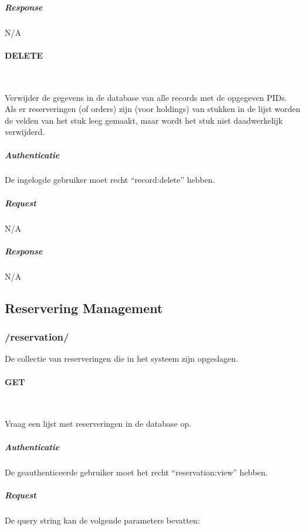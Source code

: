 \documentclass[a4paper,titlepage]{report}
\makeatletter
\def\namedlabel#1#2{
  \label{#1}
  \begingroup
   \def\@currentlabel{#2}%
   \label{#1:name}\endgroup
}
\makeatother
\begin{document}
          \subparagraph{Response} N/A

        \paragraph{DELETE}\hfill\\
          \namedlabel{api:record:delete}{DELETE /record/[pid,pid,pid,\ldots]}
          Verwijder de gegevens in de database van alle records met de
          opgegeven PIDs.  Als er reserveringen (of orders) zijn (voor holdings)
          van stukken in de lijst worden de velden van het stuk leeg gemaakt, maar
          wordt het stuk niet daadwerkelijk verwijderd. 

          \subparagraph{Authenticatie}
            De ingelogde gebruiker moet recht ``record:delete'' hebben.

          \subparagraph{Request} N/A
          \subparagraph{Response} N/A

    \pagebreak
    \subsection{Reservering Management}
      \subsubsection{/reservation/}
        De collectie van reserveringen die in het systeem zijn opgeslagen.

        \paragraph{GET}\hfill\\
          \namedlabel{api:reservation-list:get}{GET /reservation/}
          Vraag een lijst met reserveringen in de database op.

          \subparagraph{Authenticatie}
            De geauthenticeerde gebruiker moet het recht ``reservation:view''
            hebben.

          \subparagraph{Request}
            De query string kan de volgende parameters bevatten:\\
\end{document}
